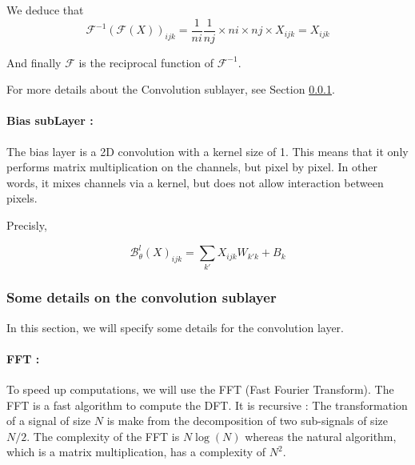 We deduce that
\begin{equation*}
	\mathcal{F}^{-1}(\mathcal{F}(X))_{ijk} = \frac{1}{ni}\frac{1}{nj} \times ni\times nj\times X_{ijk} = X_{ijk}
\end{equation*}

And finally $\mathcal{F}$ is the reciprocal function of $\mathcal{F}^{-1}$.

For more details about the Convolution sublayer, see Section \ref{FNO.details_conv}.

\paragraph{Bias subLayer :}


The bias layer is a 2D convolution with a kernel size of 1. This means that it only performs matrix multiplication on the channels, but pixel by pixel. In other words, it mixes channels via a kernel, but does not allow interaction between pixels.

Precisly,

\begin{equation*}
	\mathcal{B}_\theta^l(X)_{ijk}=\sum_{k'}X_{ijk}W_{k'k}+B_k
\end{equation*}

\subsubsection{Some details on the convolution sublayer} \label{FNO.details_conv}

In this section, we will specify some details for the convolution layer.

\paragraph{FFT :}

To speed up computations, we will use the FFT (Fast Fourier Transform). The FFT is a fast algorithm to compute the DFT. It is recursive : The transformation of a signal of size $N$ is make from the decomposition of two sub-signals of size $N/2$. The complexity of the FFT is $N\log(N)$ whereas the natural algorithm, which is a matrix multiplication, has a complexity of $N^2$.

